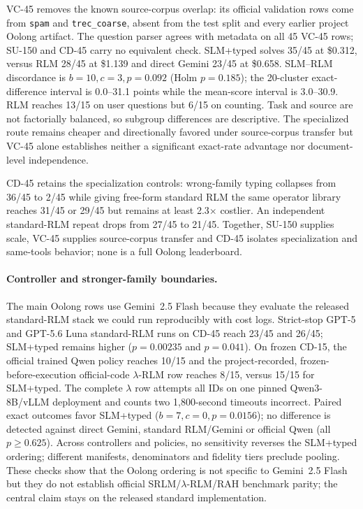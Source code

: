 \documentclass[letterpaper]{article}
\begin{document}
VC-45 removes the known source-corpus overlap: its official validation rows come from \texttt{spam} and \texttt{trec\_coarse}, absent from the test split and every earlier project Oolong artifact. The question parser agrees with metadata on all 45 VC-45 rows; SU-150 and CD-45 carry no equivalent check. SLM+typed solves 35/45 at \$0.312, versus RLM 28/45 at \$1.139 and direct Gemini 23/45 at \$0.658. SLM--RLM discordance is $b{=}10,c{=}3,p{=}0.092$ (Holm $p{=}0.185$); the 20-cluster exact-difference interval is 0.0--31.1 points while the mean-score interval is 3.0--30.9. RLM reaches 13/15 on user questions but 6/15 on counting. Task and source are not factorially balanced, so subgroup differences are descriptive. The specialized route remains cheaper and directionally favored under source-corpus transfer but VC-45 alone establishes neither a significant exact-rate advantage nor document-level independence.

CD-45 retains the specialization controls: wrong-family typing collapses from 36/45 to 2/45 while giving free-form standard RLM the same operator library reaches 31/45 or 29/45 but remains at least 2.3$\times$ costlier. An independent standard-RLM repeat drops from 27/45 to 21/45. Together, SU-150 supplies scale, VC-45 supplies source-corpus transfer and CD-45 isolates specialization and same-tools behavior; none is a full Oolong leaderboard.

\paragraph{Controller and stronger-family boundaries.}
The main Oolong rows use Gemini~2.5 Flash because they evaluate the released standard-RLM stack we could run reproducibly with cost logs. Strict-stop GPT-5 and GPT-5.6 Luna standard-RLM runs on CD-45 reach 23/45 and 26/45; SLM+typed remains higher ($p{=}0.00235$ and $p{=}0.041$). On frozen CD-15, the official trained Qwen policy reaches 10/15 and the project-recorded, frozen-before-execution official-code $\lambda$-RLM row reaches 8/15, versus 15/15 for SLM+typed. The complete $\lambda$ row attempts all IDs on one pinned Qwen3-8B/vLLM deployment and counts two 1,800-second timeouts incorrect. Paired exact outcomes favor SLM+typed ($b{=}7,c{=}0,p{=}0.0156$); no difference is detected against direct Gemini, standard RLM/Gemini or official Qwen (all $p{\geq}0.625$). Across controllers and policies, no sensitivity reverses the SLM+typed ordering; different manifests, denominators and fidelity tiers preclude pooling. These checks show that the Oolong ordering is not specific to Gemini~2.5 Flash but they do not establish official SRLM/$\lambda$-RLM/RAH benchmark parity; the central claim stays on the released standard implementation.
\end{document}
